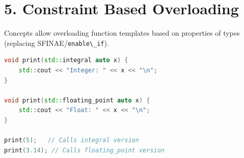 \hypertarget{constraint-based-overloading}{%
\section{5. Constraint Based
Overloading}\label{constraint-based-overloading}}

Concepts allow overloading function templates based on properties of
types (replacing SFINAE/\passthrough{\lstinline!enable\_if!}).

\begin{lstlisting}[language={C++}]
void print(std::integral auto x) {
    std::cout << "Integer: " << x << "\n";
}

void print(std::floating_point auto x) {
    std::cout << "Float: " << x << "\n";
}

print(5);   // Calls integral version
print(3.14); // Calls floating_point version
\end{lstlisting}
